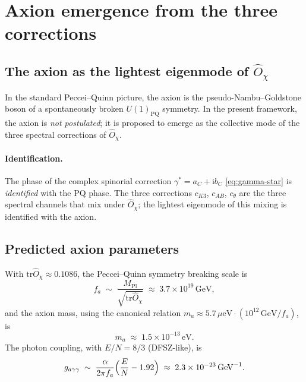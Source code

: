 \documentclass[11pt,a4paper]{article}
\newcommand{\Opchi}{\hat{O}_\chi}
\providecommand{\ii}{}
\renewcommand{\ii}{\mathrm{i}}
\providecommand{\tr}{}
\renewcommand{\tr}{\mathrm{tr}}
\theoremstyle{plain}
\theoremstyle{definition}
\theoremstyle{remark}
\begin{document}
\section{Axion emergence from the three corrections}
\label{sec:axion}

\subsection{The axion as the lightest eigenmode of $\Opchi$}

In the standard Peccei--Quinn picture, the axion is the
pseudo-Nambu--Goldstone boson of a spontaneously broken
$U(1)_{\mathrm{PQ}}$ symmetry.  In the present framework, the axion
is \emph{not postulated}; it is proposed to emerge as the collective
mode of the three spectral corrections of $\Opchi$.

\paragraph{Identification.}  The phase of the complex spinorial
correction $\gamma^\ast = a_C + \ii b_C$ \eqref{eq:gamma-star} is
\emph{identified} with the PQ phase.  The three
corrections $c_{K3}$, $c_{AB}$, $c_\theta$ are the three spectral
channels that mix under $\Opchi$; the lightest eigenmode of this
mixing is identified with the axion.

\subsection{Predicted axion parameters}

With $\tr\Opchi \approx 0.1086$, the Peccei--Quinn symmetry breaking
scale is
\begin{equation}
  f_a \;\sim\; \frac{M_{\mathrm{Pl}}}{\sqrt{\tr\Opchi}}
  \;\approx\; 3.7 \times 10^{19}\,\mathrm{GeV},
\end{equation}
and the axion mass, using the canonical relation
$m_a \approx 5.7\,\mu\mathrm{eV}\cdot(10^{12}\,\mathrm{GeV}/f_a)$, is
\begin{equation}
  m_a \;\approx\; 1.5 \times 10^{-13}\,\mathrm{eV}.
\end{equation}
The photon coupling, with $E/N = 8/3$ (DFSZ-like), is
\begin{equation}
  g_{a\gamma\gamma}
  \;\sim\; \frac{\alpha}{2\pi f_a}\Bigl(\frac{E}{N} - 1.92\Bigr)
  \;\approx\; 2.3 \times 10^{-23}\,\mathrm{GeV}^{-1}.
\end{equation}
\end{document}
